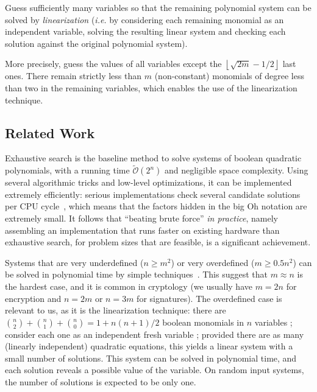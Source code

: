 \documentclass[a4paper]{article}
\newcommand{\bigOsoft}[1]{\ensuremath{\mathcal{\tilde O}\left( #1 \right)} }
\begin{document}
\begin{framed}
  Guess sufficiently many variables so that the remaining polynomial system can
  be solved by \emph{linearization} (\textit{i.e.} by considering each remaining
  monomial as an independent variable, solving the resulting linear system and
  checking each solution against the original polynomial system).
\end{framed}

More precisely, guess the values of all variables except the
$\left\lfloor \sqrt{2m} - 1/2 \right\rfloor$ last ones. There remain strictly
less than $m$ (non-constant) monomials of degree less than two in the remaining
variables, which enables the use of the linearization technique.

\subsection{Related Work}

Exhaustive search is the baseline method to solve systems of boolean quadratic
polynomials, with a running time $\bigOsoft{2^n}$ and negligible space
complexity. Using several algorithmic tricks and low-level optimizations, it can
be implemented extremely efficiently: serious implementations check several
candidate solutions per CPU cycle~\cite{BouillaguetCCCNSY10}, which means that
the factors hidden in the big Oh notation are extremely small. It follows that
``beating brute force'' \emph{in practice}, namely assembling an implementation
that runs faster on existing hardware than exhaustive search, for problem sizes
that are feasible, is a significant achievement.

Systems that are very underdefined ($n \geq m^2$) or very overdefined
($m \geq 0.5 n^2$) can be solved in polynomial time by simple
techniques~\cite{CourtoisGMT02}. This suggest that $m \approx n$ is the hardest
case, and it is common in cryptology (we usually have $m=2n$ for encryption and
$n = 2m$ or $n=3m$ for signatures). The overdefined case is relevant to us, as
it is the linearization technique: there are
$\binom{n}{2} + \binom{n}{1} + \binom{n}{0} = 1 + n(n+1)/2$ boolean monomials in
$n$ variables ; consider each one as an independent fresh variable ; provided
there are as many (linearly independent) quadratic equations, this yields a
linear system with a small number of solutions. This system can be solved in
polynomial time, and each solution reveals a possible value of the variable. On
random input systems, the number of solutions is expected to be only one.
\end{document}
